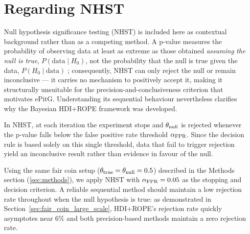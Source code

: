 \section{Regarding NHST}\label{app:nhst}
Null hypothesis significance testing (NHST) \citep{fisher1925, neymanpearson1933}
%
is included here as contextual background rather than as a competing method.
A p-value measures the probability of observing data at least as extreme as those
obtained \emph{assuming the null is true}, $P(\mathrm{data}\mid H_0)$, not the
probability that the null is true given the data, $P(H_0\mid\mathrm{data})$
%
\citep{cohen1994, wasserstein2016};
consequently, NHST can only reject the null or remain inconclusive --- it carries
no mechanism to positively accept it, making it structurally unsuitable for the
precision-and-conclusiveness criterion that motivates ePitG.
Understanding its sequential behaviour nevertheless clarifies why the Bayesian
HDI+ROPE framework was developed.

In NHST, at each iteration the experiment stops and $\theta_{\rm null}$ is rejected
whenever the p-value falls below the false positive rate threshold $\alpha_{\rm FPR}$.
Since the decision rule is based solely on this single threshold, data that fail to
trigger rejection yield an inconclusive result rather than evidence in favour of the null.

Using the same fair coin setup ($\theta_{\rm true}=\theta_{\rm null}=0.5$) described
in the Methods section (\ref{sec:methods}), we apply NHST with $\alpha_{\rm FPR}=0.05$
as the stopping and decision criterion. A reliable sequential method should maintain a
low rejection rate throughout when the null hypothesis is true: as demonstrated in
Section~\ref{sec:fair_coin_large_scale}, HDI+ROPE's rejection rate quickly asymptotes near 6\% and
both precision-based methods maintain a zero rejection rate.

